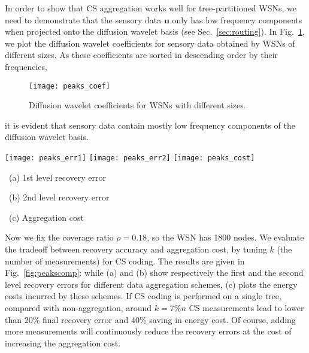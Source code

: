 \documentclass[conference]{IEEEtran}
\begin{document}
    In order to show that CS aggregation works well for tree-partitioned WSNs, we need to demonstrate that the sensory data $\mathbf{u}$ only has low frequency components when projected onto the diffusion wavelet basis (see Sec.~\ref{sec:routing}). In Fig.~\ref{fig:peakscoef}, we plot the diffusion wavelet coefficients for sensory data obtained by WSNs of different sizes. As these coefficients are sorted in descending order by their frequencies,
    \begin{figure}[ht]
      \begin{center}
        \texttt{[image: peaks\_coef]}
        \caption{Diffusion wavelet coefficients for WSNs with different sizes.}
        \label{fig:peakscoef}
      \end{center}
\end{figure}
it is evident that sensory data contain mostly low frequency components of the diffusion wavelet basis.
    \begin{figure*}[t]
\begin{center}
        \texttt{[image: peaks\_err1]}
	    \texttt{[image: peaks\_err2]}
        \texttt{[image: peaks\_cost]}
        \parbox{.33\textwidth}{\center\scriptsize~(a) 1st level recovery error}
        \parbox{.33\textwidth}{\center\scriptsize~(b) 2nd level recovery error}
        \parbox{.32\textwidth}{\center\scriptsize~(c) Aggregation cost}
\caption{Comparisons based on synthetic data. Here ST/MT corresponds to CDA on single tree or multiple trees. Whereas $k$ refers to the CS measurements in ST case, $k_i$ denotes the measurements used for each subtree. IR and JR are short for independent recovery and joint recovery, respectively.}
        \label{fig:peakscomp}
      \end{center}
\end{figure*}

    Now we fix the coverage ratio $\rho=0.18$, so the WSN has 1800 nodes. We evaluate the tradeoff between recovery accuracy and aggregation cost, by tuning $k$ (the number of measurements) for CS coding. The results are given in Fig.~\ref{fig:peakscomp}: while (a) and (b) show respectively the first and the second level recovery errors for different data aggregation schemes, (c) plots the energy costs incurred by these schemes.
    If CS coding is performed on a single tree, compared with non-aggregation, around $k=7\%n$ CS measurements lead to lower than 20\% final recovery error and 40\% saving in energy cost. Of course, adding more measurements will continuously reduce the recovery errors at the cost of increasing the aggregation cost.
\end{document}
